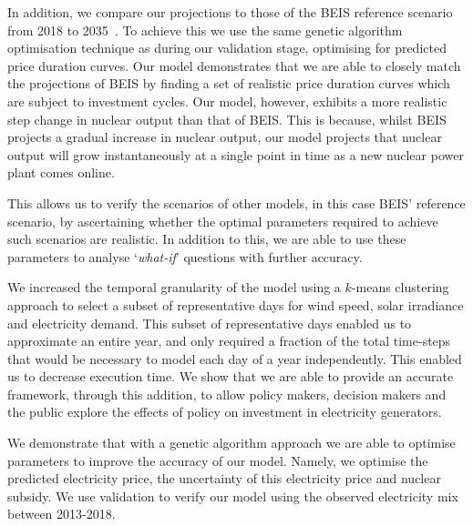 In addition, we compare our projections to those of the BEIS reference scenario from 2018 to 2035~\cite{DBEIS2019}. To achieve this we use the same genetic algorithm optimisation technique as during our validation stage, optimising for predicted price duration curves. Our model demonstrates that we are able to closely match the projections of BEIS by finding a set of realistic price duration curves which are subject to investment cycles. Our model, however, exhibits a more realistic step change in nuclear output than that of BEIS. This is because, whilst BEIS projects a gradual increase in nuclear output, our model projects that nuclear output will grow instantaneously at a single point in time as a new nuclear power plant comes online. 

This allows us to verify the scenarios of other models, in this case BEIS' reference scenario, by ascertaining whether the optimal parameters required to achieve such scenarios are realistic. In addition to this, we are able to use these parameters to analyse `\textit{what-if}' questions with further accuracy.





We increased the temporal granularity of the model using a $k$-means clustering approach to select a subset of representative days for wind speed, solar irradiance and electricity demand. This subset of representative days enabled us to approximate an entire year, and only required a fraction of the total time-steps that would be necessary to model each day of a year independently. This enabled us to  decrease execution time. We show that we are able to provide an accurate framework, through this addition, to allow policy makers, decision makers and the public explore the effects of policy on investment in electricity generators. 


We demonstrate that with a genetic algorithm approach we are able to optimise parameters to improve the accuracy of our model. Namely, we optimise the predicted electricity price, the uncertainty of this electricity price and nuclear subsidy. We use validation to verify our model using the observed electricity mix between 2013-2018.

